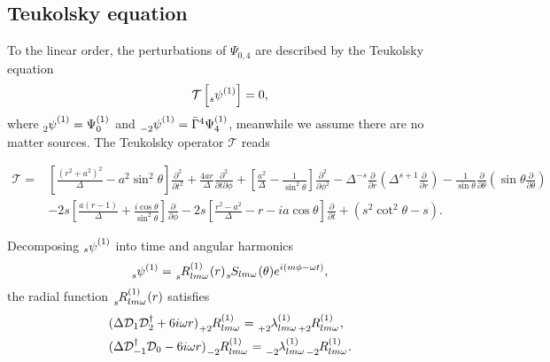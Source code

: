\documentclass[aps,prd,amsmath,floats,floatfix, twocolumn,
superscriptaddress,nofootinbib,showpacs]{revtex4-1}
\begin{document}
\subsection{Teukolsky equation}
\label{subsec:Teukolsky_review}
To the linear order, the perturbations of $\Psi_{0,4}$ are described by the Teukolsky equation \cite{PhysRevLett.29.1114,Teukolsky:1973ApJ}
\begin{align}
    \mathcal{T} \left[\tensor[_{s}]{\psi}{^{(1)}}\right] = 0,
\end{align}
where $\tensor[_{2}]{\psi}{^{(1)}}=\Psi_0^{(1)}$ and $\tensor[_{-2}]{\psi}{^{(1)}}=\bar{\Gamma}^4\Psi_4^{(1)}$, meanwhile we
assume there are no matter sources. The Teukolsky operator $\mathcal{T}$ reads
\begin{widetext}
\begin{align}
\mathcal{T} =& \left [ \frac{(r^2+a^2)^2}{\Delta} -a^2\sin^2\theta\right ]\frac{\partial^2}{\partial t^2}+\frac{4 a r}{\Delta } \frac{\partial^2}{\partial t\partial \phi}+\left [\frac{a^2}{\Delta}-\frac{1}{\sin^2\theta}\right ]\frac{\partial^2}{\partial \phi^2} -\Delta^{-s}\frac{\partial}{\partial r} \left ( \Delta^{s+1}\frac{\partial}{\partial r}\right ) -\frac{1}{\sin\theta}\frac{\partial}{\partial \theta} \left ( \sin\theta \frac{\partial}{\partial \theta}\right ) \nonumber \\
&-2 s \left [ \frac{a(r-1)}{\Delta}+\frac{i \cos\theta}{\sin^2\theta}\right ]\frac{\partial}{\partial \phi}-2 s \left [\frac{r^2-a^2}{\Delta}-r-i a \cos\theta\right ]\frac{\partial}{\partial t}+(s^2\cot^2\theta-s). \label{eq:Teukolsky_operator_t_phi}
\end{align}
\end{widetext}
Decomposing $\tensor[_{s}]{\psi}{^{(1)}}$ into time and angular harmonics 
\begin{align}
    \tensor[_{s}]{\psi}{^{(1)}}= \tensor[_{s}]{{R_{lm\omega}^{(1)}}}{}(r) \tensor[_{s}]{{S_{lm\omega}}}{}(\theta) e^{i(m\phi-\omega t)},
\end{align}
the radial function $\tensor[_{s}]{{R_{lm\omega}^{(1)}}}{}(r)$ satisfies \cite{chandrasekhar1998mathematical}
\begin{subequations}
\label{eq:linear_teukolsky_s_pm2}
\begin{align}
    &( \Delta \mathcal{D}_1\mathcal{D}_2^\dagger+6i\omega r)\tensor[_{+2}]{{R_{lm\omega}^{(1)}}}{}=\tensor[_{+2}]{{\lambda_{lm\omega}^{(1)}}}{}\tensor[_{+2}]{{R_{lm\omega}^{(1)}}}{},  \label{eq:Teukolsky_equation_s2} \\
    &( \Delta \mathcal{D}_{-1}^\dagger\mathcal{D}_0-6i\omega r)\tensor[_{-2}]{{R_{lm\omega}^{(1)}}}{}=\tensor[_{-2}]{{\lambda_{lm\omega}^{(1)}}}{}\tensor[_{-2}]{{R_{lm\omega}^{(1)}}}{}. 
\end{align}
\end{subequations}
\end{document}
